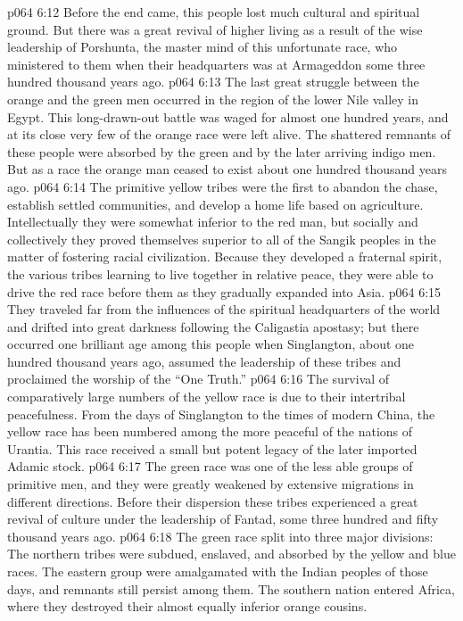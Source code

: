 \vs p064 6:12 Before the end came, this people lost much cultural and spiritual ground. But there was a great revival of higher living as a result of the wise leadership of Porshunta, the master mind of this unfortunate race, who ministered to them when their headquarters was at Armageddon some three hundred thousand years ago.
\vs p064 6:13 The last great struggle between the orange and the green men occurred in the region of the lower Nile valley in Egypt. This long\hyp{}drawn\hyp{}out battle was waged for almost one hundred years, and at its close very few of the orange race were left alive. The shattered remnants of these people were absorbed by the green and by the later arriving indigo men. But as a race the orange man ceased to exist about one hundred thousand years ago.
\pc \vs p064 6:14 \bibnobreakspace {} The primitive yellow tribes were the first to abandon the chase, establish settled communities, and develop a home life based on agriculture. Intellectually they were somewhat inferior to the red man, but socially and collectively they proved themselves superior to all of the Sangik peoples in the matter of fostering racial civilization. Because they developed a fraternal spirit, the various tribes learning to live together in relative peace, they were able to drive the red race before them as they gradually expanded into Asia.
\vs p064 6:15 They traveled far from the influences of the spiritual headquarters of the world and drifted into great darkness following the Caligastia apostasy; but there occurred one brilliant age among this people when Singlangton, about one hundred thousand years ago, assumed the leadership of these tribes and proclaimed the worship of the “One Truth.”
\vs p064 6:16 The survival of comparatively large numbers of the yellow race is due to their intertribal peacefulness. From the days of Singlangton to the times of modern China, the yellow race has been numbered among the more peaceful of the nations of Urantia. This race received a small but potent legacy of the later imported Adamic stock.
\pc \vs p064 6:17 \bibnobreakspace {} The green race was one of the less able groups of primitive men, and they were greatly weakened by extensive migrations in different directions. Before their dispersion these tribes experienced a great revival of culture under the leadership of Fantad, some three hundred and fifty thousand years ago.
\vs p064 6:18 The green race split into three major divisions: The northern tribes were subdued, enslaved, and absorbed by the yellow and blue races. The eastern group were amalgamated with the Indian peoples of those days, and remnants still persist among them. The southern nation entered Africa, where they destroyed their almost equally inferior orange cousins.
